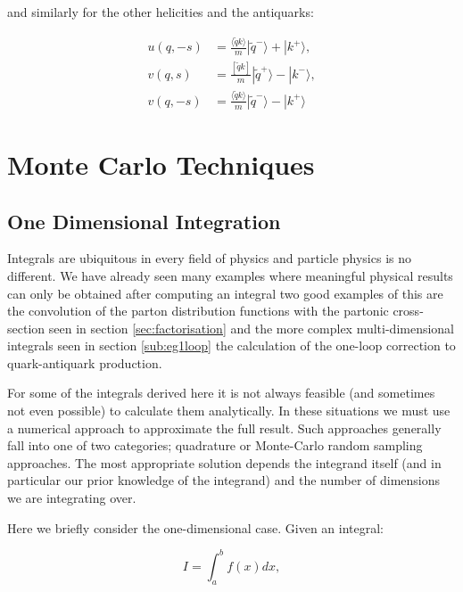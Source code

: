 		and similarly for the other helicities and the antiquarks:

		\begin{subequations}
		\begin{align}
			u(q, -s) &= \frac{\langle \widetilde{q}k\rangle}{m}|\widetilde{q}^-\rangle + |k^+\rangle, \\
			v(q,  s) &= \frac{[\widetilde{q}k]}{m}|\widetilde{q}^+\rangle - |k^-\rangle, \\
			v(q, -s) &= \frac{\langle \widetilde{q}k\rangle}{m}|\widetilde{q}^-\rangle - |k^+\rangle
		\end{align}
		\end{subequations}

\section{Monte Carlo Techniques}
	\label{sec:MC}

	\subsection{One Dimensional Integration}
	\label{sub:MCOneD}

	Integrals are ubiquitous in every field of physics and particle physics is no different.  We have already seen many examples where meaningful physical results
	can only be obtained after computing an integral two good examples of this are the convolution of the parton distribution functions with the partonic
	cross-section seen in section \ref{sec:factorisation} and the more complex multi-dimensional integrals seen in section \ref{sub:eg1loop} the calculation
	of the one-loop correction to quark-antiquark production.

	For some of the integrals derived here it is not always feasible (and sometimes not even possible) to calculate them analytically.  In these situations
	we must use a numerical approach to approximate the full result.  Such approaches generally fall into one of two categories; quadrature
	or Monte-Carlo random sampling approaches.  The most appropriate solution depends the integrand itself (and in particular our prior knowledge of
	the integrand) and the number of dimensions we are integrating over.

	Here we briefly consider the one-dimensional case.  Given an integral:

	\begin{equation}
		I = \int_a^b f(x)dx,
		\label{eqn:1DIntegral}
	\end{equation}

